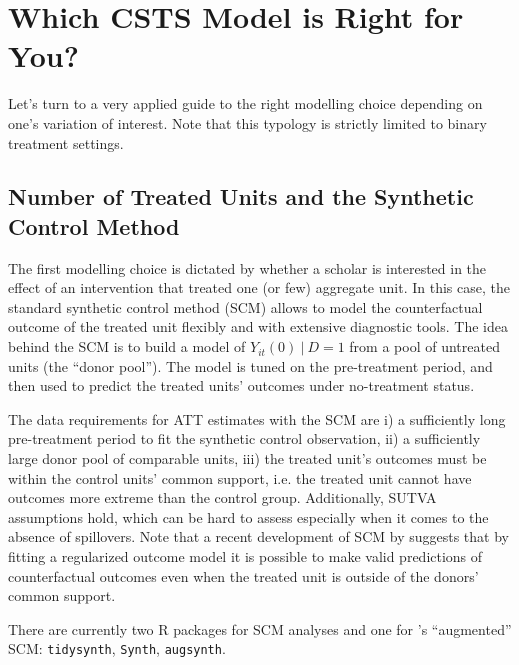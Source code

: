 \documentclass[hidelinks]{article}\usepackage[]{graphicx}\usepackage[]{color}
\begin{document}
\section{Which CSTS Model is Right for You?}

Let's turn to a very applied guide to the right modelling choice depending on one's variation of interest. Note that this typology is strictly limited to binary treatment settings.

\subsection{Number of Treated Units and the Synthetic Control Method}

The first modelling choice is dictated by whether a scholar is interested in the effect of an intervention that treated one (or few) aggregate unit. In this case, the standard synthetic control method (SCM) allows to model the counterfactual outcome of the treated unit flexibly and with extensive diagnostic tools. The idea behind the SCM is to build a model of $Y_{it}(0)\ | \ D=1$ from a pool of untreated units (the ``donor pool''). The model is tuned on the pre-treatment period, and then used to predict the treated units' outcomes under no-treatment status.

The data requirements for ATT estimates with the SCM are i) a sufficiently long pre-treatment period to fit the synthetic control observation, ii) a sufficiently large donor pool of comparable units, iii) the treated unit's outcomes must be within the control units' common support, i.e. the treated unit cannot have outcomes more extreme than the control group. Additionally, SUTVA assumptions hold, which can be hard to assess especially when it comes to the absence of spillovers.
Note that a recent development of SCM by \textcite{BenMichael2021} suggests that by fitting a regularized outcome model it is possible to make valid predictions of counterfactual outcomes even when the treated unit is outside of the donors' common support.

There are currently two R packages for SCM analyses and one for \citeauthor{BenMichael2021}'s ``augmented'' SCM: \texttt{tidysynth}, \texttt{Synth}, \texttt{augsynth}.
\end{document}
